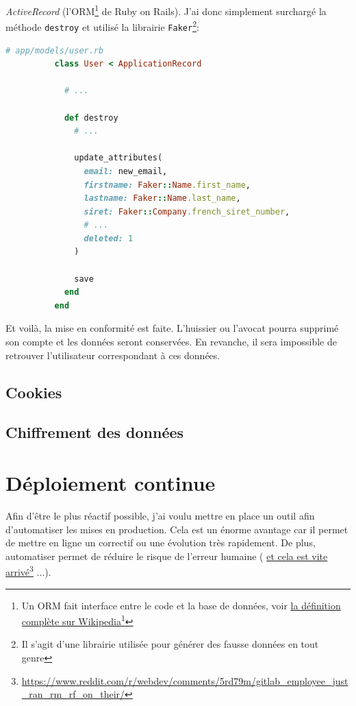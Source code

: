\documentclass[]{report}
\newcommand\fnurl[2]{%
  \href{#1}{#2}\footnote{\url{#1}}%
}
\begin{document}
        \textit{ActiveRecord} (l'ORM\footnote{Un ORM fait interface entre le code et la base de données, voir \fnurl{https://fr.wikipedia.org/wiki/Mapping_objet-relationnel}{la définition complète sur Wikipedia}} de Ruby on Rails). J'ai donc simplement surchargé la méthode \verb|destroy| et utilisé la librairie \verb|Faker|\footnote{Il s'agit d'une librairie utilisée pour générer des fausse données en tout genre}:

        \begin{scriptsize}
          \begin{lstlisting}[language=ruby]
          # app/models/user.rb
          class User < ApplicationRecord

            # ...

            def destroy
              # ...

              update_attributes(
                email: new_email,
                firstname: Faker::Name.first_name,
                lastname: Faker::Name.last_name,
                siret: Faker::Company.french_siret_number,
                # ...
                deleted: 1
              )

              save
            end
          end
          \end{lstlisting}
        \end{scriptsize}

        Et voilà, la mise en conformité est faite. L'huissier ou l'avocat pourra supprimé son compte et les données seront conservées. En revanche, il sera impossible de retrouver l'utilisateur correspondant à ces données.

    \subsection{Cookies}


    \subsection{Chiffrement des données}


  \section{Déploiement continue}\label{sec:deployments}

    Afin d'être le plus réactif possible, j'ai voulu mettre en place un outil afin d'automatiser les mises en production. Cela est un énorme avantage car il permet de mettre en ligne un correctif ou une évolution très rapidement. De plus, automatiser permet de réduire le risque de l'erreur humaine (\fnurl{https://www.reddit.com/r/webdev/comments/5rd79m/gitlab_employee_just_ran_rm_rf_on_their/}{et cela est vite arrivé}...).
\end{document}
